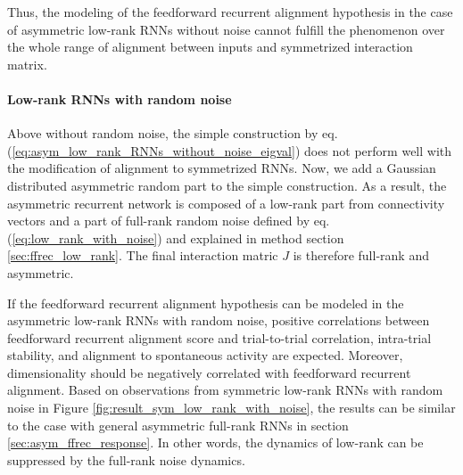 \documentclass[11pt]{article}
\begin{document}
	Thus, the modeling of the feedforward recurrent alignment hypothesis in the case of asymmetric low-rank RNNs without noise cannot fulfill the phenomenon over the whole range of alignment between inputs and symmetrized interaction matrix. 

	\vspace{0.5cm}
	\paragraph{Low-rank RNNs with random noise}
	Above without random noise, the simple construction by eq.(\ref{eq:asym_low_rank_RNNs_without_noise_eigval}) does not perform well with the modification of alignment to symmetrized RNNs. Now, we add a Gaussian distributed asymmetric random part to the simple construction. As a result, the asymmetric recurrent network is composed of a low-rank part from connectivity vectors and a part of full-rank random noise defined by eq. (\ref{eq:low_rank_with_noise}) and explained in method section \ref{sec:ffrec_low_rank}. The final interaction matric $J$ is therefore full-rank and asymmetric. 
	
	If the feedforward recurrent alignment hypothesis can be modeled in the asymmetric low-rank RNNs with random noise, positive correlations between feedforward recurrent alignment score and trial-to-trial correlation, intra-trial stability, and alignment to spontaneous activity are expected. Moreover, dimensionality should be negatively correlated with feedforward recurrent alignment. Based on observations from symmetric low-rank RNNs with random noise in Figure \ref{fig:result_sym_low_rank_with_noise}, the results can be similar to the case with general asymmetric full-rank RNNs in section \ref{sec:asym_ffrec_response}. In other words, the dynamics of low-rank can be suppressed by the full-rank noise dynamics.  
	
\end{document}
